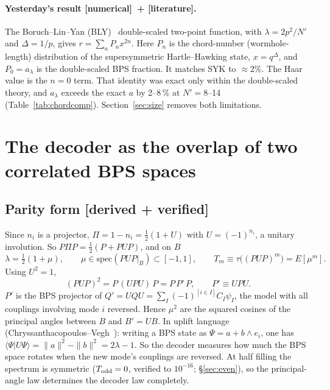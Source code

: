\documentclass[11pt]{article}
\newcommand{\Np}{N'}
\newcommand{\tagbox}[2]{\textsf{\small\color{#1}[#2]}}
\newcommand{\EST}{\tagbox{cest}{literature}}
\newcommand{\VER}{\tagbox{cder}{derived + verified}}
\newcommand{\NUM}{\tagbox{cnum}{numerical}}
\theoremstyle{remark}
\begin{document}
\paragraph{Yesterday's result \NUM\ + \EST.} The Boruch--Lin--Yan (BLY)~\cite{BLY} double-scaled two-point function,
with $\lambda=2p^2/\Np$ and $\Delta=1/p$, gives $r=\sum_nP_nx^{2n}$. Here $P_n$ is the chord-number (wormhole-length)
distribution of the supersymmetric Hartle--Hawking state, $x=q^{\Delta}$, and $P_0=a_\lambda$ is the double-scaled BPS
fraction. It matches SYK to $\approx2\%$. The Haar value is the $n=0$ term. That identity was exact only within the
double-scaled theory, and $a_\lambda$ exceeds the exact $a$ by 2--8\,\% at $\Np=8$--14 (Table~\ref{tab:chordcomp}). Section~\ref{sec:size} removes both
limitations.

\section{The decoder as the overlap of two correlated BPS spaces}\label{sec:parity}
\subsection{Parity form \VER}
Since $n_i$ is a projector, $\Pi=1-n_i=\frac12(1+U)$ with $U=(-1)^{n_i}$, a unitary involution. So
$P\Pi P=\frac12(P+PUP)$, and on $B$
\begin{equation}
\lambda=\tfrac12(1+\mu),\qquad \mu\in\mathrm{spec}(PUP|_B)\subset[-1,1],\qquad
T_m\equiv\tau\big((PUP)^m\big)=E[\mu^m] .
\end{equation}
Using $U^2=1$,
\begin{equation}
(PUP)^2=P\,(UPU)\,P=P\,P'\,P,\qquad P'\equiv UPU .
\label{eq:PPp}
\end{equation}
$P'$ is the BPS projector of $Q'=UQU=\sum_I(-1)^{[i\in I]}C_I\psi_I$, the model with all couplings involving mode $i$
reversed. Hence $\mu^2$ are the squared cosines of the principal angles between $B$ and $B'=UB$. In uplift language
(Chryssanthacopoulos--Vegh~\cite{CV}): writing a BPS state as $\Psi=a+b\wedge e_i$, one has
$\langle\Psi|U\Psi\rangle=\|a\|^2-\|b\|^2=2\lambda-1$. So the decoder measures how much the BPS space rotates when the
new mode's couplings are reversed. At half filling the spectrum is symmetric ($T_{\rm odd}=0$, verified to
$10^{-16}$; \S\ref{sec:even}), so the principal-angle law determines the decoder law completely.
\end{document}
